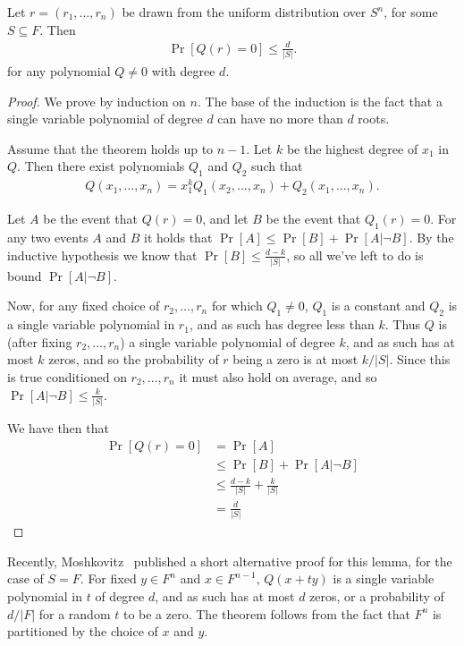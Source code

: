 \documentclass{article}
\begin{document}
\begin{lemma}
  Let $r = (r_1, \ldots, r_n)$ be drawn from the uniform distribution
  over $S^n$, for some $S \subseteq F$. Then
  \begin{align*}
    \Pr[Q(r) = 0] \leq \frac{d}{|S|}.
  \end{align*}
  for any polynomial $Q \neq 0$ with degree $d$.
\end{lemma}
\begin{proof}
  We prove by induction on $n$. The base of the induction is the fact
  that a single variable polynomial of degree $d$ can have no more
  than $d$ roots.

  Assume that the theorem holds up to $n-1$. Let $k$ be the highest
  degree of $x_1$ in $Q$. Then there exist polynomials $Q_1$ and $Q_2$
  such that
  \begin{align*}
    Q(x_1, \ldots, x_n) = x_1^kQ_1(x_2, \ldots, x_n) + Q_2(x_1, \ldots, x_n).
  \end{align*}

  Let $A$ be the event that $Q(r) = 0$, and let $B$ be the event that
  $Q_1(r) = 0$. For any two events $A$ and $B$ it holds that $\Pr[A]
  \leq \Pr[B] + \Pr[A| \neg B]$. By the inductive hypothesis we know
  that $\Pr[B] \leq \frac{d-k}{|S|}$, so all we've left to do is bound
  $\Pr[A | \neg B]$.
  
  Now, for any fixed choice of $r_2, \ldots, r_n$ for which $Q_1 \neq
  0$, $Q_1$ is a constant and $Q_2$ is a single variable polynomial in
  $r_1$, and as such has degree less than $k$. Thus $Q$ is (after
  fixing $r_2, \ldots, r_n$) a single variable polynomial of degree
  $k$, and as such has at most $k$ zeros, and so the probability of
  $r$ being a zero is at most $k/|S|$. Since this is true conditioned on
  $r_2, \ldots, r_n$ it must also hold on average, and so $\Pr[A |
  \neg B] \leq \frac{k}{|S|}$.

  We have then that
  \begin{align*}
    \Pr[Q(r) = 0] &= \Pr[A]
    \\ &\leq \Pr[B] + \Pr[A| \neg B]
    \\ &\leq \frac{d-k}{|S|} + \frac{k}{|S|}
    \\ &= \frac{d}{|S|}
  \end{align*}
\end{proof}

Recently, Moshkovitz~\cite{Moshkovitz:2010} published a short
alternative proof for this lemma, for the case of $S=F$. For fixed $y
\in F^n$ and $x \in F^{n-1}$, $Q(x+ty)$ is a single variable
polynomial in $t$ of degree $d$, and as such has at most $d$ zeros, or
a probability of $d/|F|$ for a random $t$ to be a zero. The theorem
follows from the fact that $F^n$ is partitioned by the choice of $x$
and $y$.
\end{document}
